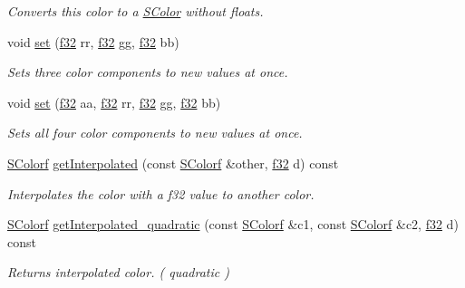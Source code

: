 \begin{DoxyCompactItemize}
\begin{DoxyCompactList}\small\item\em Converts this color to a \hyperlink{classirr_1_1video_1_1SColor}{S\+Color} without floats. \end{DoxyCompactList}\item 
void \hyperlink{classirr_1_1video_1_1SColorf_a99fe5c7d261d288d9afe301d4b90d41c}{set} (\hyperlink{namespaceirr_a0277be98d67dc26ff93b1a6a1d086b07}{f32} rr, \hyperlink{namespaceirr_a0277be98d67dc26ff93b1a6a1d086b07}{f32} gg, \hyperlink{namespaceirr_a0277be98d67dc26ff93b1a6a1d086b07}{f32} bb)
\begin{DoxyCompactList}\small\item\em Sets three color components to new values at once. \end{DoxyCompactList}\item 
void \hyperlink{classirr_1_1video_1_1SColorf_ae5a082e95ff2631651356f8a6daa2e73}{set} (\hyperlink{namespaceirr_a0277be98d67dc26ff93b1a6a1d086b07}{f32} aa, \hyperlink{namespaceirr_a0277be98d67dc26ff93b1a6a1d086b07}{f32} rr, \hyperlink{namespaceirr_a0277be98d67dc26ff93b1a6a1d086b07}{f32} gg, \hyperlink{namespaceirr_a0277be98d67dc26ff93b1a6a1d086b07}{f32} bb)
\begin{DoxyCompactList}\small\item\em Sets all four color components to new values at once. \end{DoxyCompactList}\item 
\hyperlink{classirr_1_1video_1_1SColorf}{S\+Colorf} \hyperlink{classirr_1_1video_1_1SColorf_a43850552a0805bcdb8c246613d251cfb}{get\+Interpolated} (const \hyperlink{classirr_1_1video_1_1SColorf}{S\+Colorf} \&other, \hyperlink{namespaceirr_a0277be98d67dc26ff93b1a6a1d086b07}{f32} d) const
\begin{DoxyCompactList}\small\item\em Interpolates the color with a f32 value to another color. \end{DoxyCompactList}\item 
\hyperlink{classirr_1_1video_1_1SColorf}{S\+Colorf} \hyperlink{classirr_1_1video_1_1SColorf_ae75c258ce246833bde2cbeb6c1f786a5}{get\+Interpolated\+\_\+quadratic} (const \hyperlink{classirr_1_1video_1_1SColorf}{S\+Colorf} \&c1, const \hyperlink{classirr_1_1video_1_1SColorf}{S\+Colorf} \&c2, \hyperlink{namespaceirr_a0277be98d67dc26ff93b1a6a1d086b07}{f32} d) const
\begin{DoxyCompactList}\small\item\em Returns interpolated color. ( quadratic ) \end{DoxyCompactList}\item 

\end{DoxyCompactItemize}
